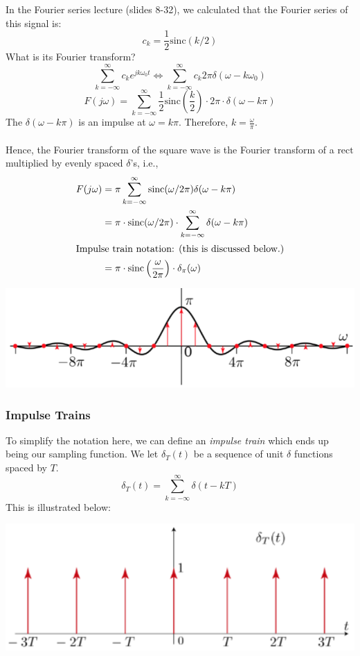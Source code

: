 \documentclass[10pt]{article}
\newcommand{\sinc}{\text{sinc}}
\newcommand{\rect}{\text{rect}}
\newcommand{\llra}{\Longleftrightarrow}
\begin{document}
In the Fourier series lecture (slides 8-32), we calculated that the Fourier series of this signal is:
\[c_k = \frac{1}{2}\sinc(k/2)\]
What is its Fourier transform?
\[\sum_{k=-\infty}^\infty c_k e^{jk\omega_0 t} \llra \sum_{k=-\infty}^\infty c_k 2\pi \delta(\omega - k\omega_0)\]
\[F(j\omega) = \sum_{k=-\infty}^\infty \frac{1}{2} \sinc\left(\frac{k}{2}\right) \cdot 2\pi \cdot \delta(\omega - k\pi)\]
The $\delta(\omega - k\pi)$ is an impulse at $\omega = k\pi$.  Therefore, $k = \frac{\omega}{\pi}$.\\\\
Hence, the Fourier transform of the square wave is the Fourier transform of a $\rect$ multiplied by evenly spaced $\delta$'s, i.e.,
\begin{align*}
    F(j\omega) &= \pi \sum_{k=-\infty}^\infty \sinc(\omega/2\pi) \delta(\omega - k\pi)\\
    &= \pi \cdot \sinc(\omega/2\pi) \cdot \sum_{k=-\infty}^\infty \delta(\omega - k\pi)\\
\intertext{Impulse train notation: (this is discussed below.)}
    &= \pi \cdot \sinc\left(\frac{\omega}{2\pi}\right) \cdot \delta_\pi(\omega)
\end{align*}
\begin{center}
    \includegraphics[width=\textwidth]{W8_7.png}
\end{center}
\subsubsection*{Impulse Trains}
To simplify the notation here, we can define an \textit{impulse train} which ends up being our sampling function.  We let $\delta_T(t)$ be a sequence of unit $\delta$ functions spaced by $T$.
\[\delta_T(t) = \sum_{k=-\infty}^\infty \delta(t - kT)\]
This is illustrated below:
\begin{center}
    \includegraphics[width=\textwidth]{W8_8.png}
\end{center}
\end{document}
